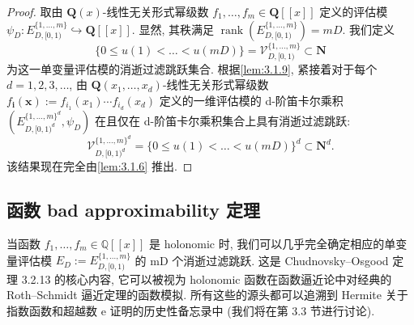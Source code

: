 \begin{proof}
取由 \(\mathbf{Q}(x)\)-线性无关形式幂级数 \(f_1,\ldots,f_m \in \mathbf{Q}[\![x]\!]\) 定义的评估模 \(\psi_D: E_{D,[0,1)}^{\{1,\ldots,m\}} \hookrightarrow \mathbf{Q}[\![x]\!]\). 
显然, 其秩满足 \(\operatorname{rank}\left(E_{D,[0,1)}^{\{1,\ldots,m\}}\right)=mD\). 我们定义
\[ \{0 \le u(1) < \dots < u(mD)\} = \mathcal{V}_{D,[0,1)}^{\{1,\dots,m\}} \subset \mathbf{N} \]
为这一单变量评估模的消逝过滤跳跃集合. 
根据\autoref{lem:3.1.9}, 紧接着对于每个 \(d=1,2,3,\ldots\), 
由 \(\mathbf{Q}(x_1,\ldots,x_d)\)-线性无关形式幂级数 \(f_{\mathbf{i}}(\mathbf{x}):=f_{i_1}(x_1)\cdots f_{i_d}(x_d)\) 
定义的一维评估模的 d-阶笛卡尔乘积 \(\left(E_{D,[0,1)^d}^{\{1,\ldots,m\}^d},\psi_D\right)\) 
在且仅在 d-阶笛卡尔乘积集合上具有消逝过滤跳跃:
\[ \mathcal{V}_{D,[0,1)^d}^{\{1,\dots,m\}^d} = \{0 \le u(1) < \dots < u(mD)\}^d \subset \mathbf{N}^d. \]
该结果现在完全由\autoref{lem:3.1.6} 推出.
\end{proof}

\subsection{函数 bad approximability 定理}\label{sec:3.2}

当函数 \(f_1, \ldots, f_m \in \mathbb{Q}[\![x]\!]\) 是 holonomic 时, 我们可以几乎完全确定相应的单变量评估模 \(E_D := E_{D,[0,1)}^{\{1,\ldots,m\}}\) 的 mD 个消逝过滤跳跃. 
这是 Chudnovsky--Osgood 定理 3.2.13 的核心内容, 它可以被视为 holonomic 函数在函数逼近论中对经典的 Roth--Schmidt 逼近定理的函数模拟. 
所有这些的源头都可以追溯到 Hermite 关于指数函数和超越数 e 证明的历史性备忘录中 (我们将在第 3.3 节进行讨论).

